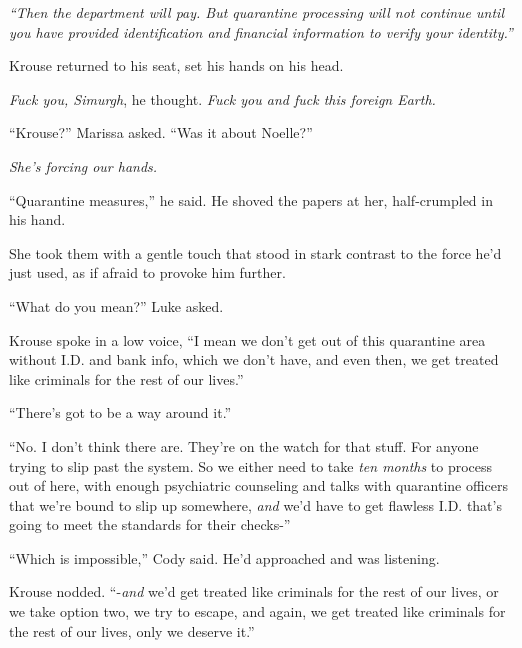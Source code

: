 \emph{``Then the department will pay.  But quarantine processing will not continue until you have provided identification and financial information to verify your identity.''}



Krouse returned to his seat, set his hands on his head.



\emph{Fuck you, Simurgh}, he thought.  \emph{Fuck you and fuck this foreign Earth.}



``Krouse?''  Marissa asked.  ``Was it about Noelle?''



\emph{She's forcing our hands.}



``Quarantine measures,'' he said.  He shoved the papers at her, half-crumpled in his hand.



She took them with a gentle touch that stood in stark contrast to the force he'd just used, as if afraid to provoke him further.



``What do you mean?'' Luke asked.



Krouse spoke in a low voice, ``I mean we don't get out of this quarantine area without I.D. and bank info, which we don't have, and even then, we get treated like criminals for the rest of our lives.''



``There's got to be a way around it.''



``No.  I don't think there are.  They're on the watch for that stuff.  For anyone trying to slip past the system.  So we either need to take \emph{ten months} to process out of here, with enough psychiatric counseling and talks with quarantine officers that we're bound to slip up somewhere, \emph{and} we'd have to get flawless I.D. that's going to meet the standards for their checks-''



``Which is impossible,'' Cody said.  He'd approached and was listening.



Krouse nodded.  ``-\emph{and} we'd get treated like criminals for the rest of our lives, or we take option two, we try to escape, and again, we get treated like criminals for the rest of our lives, only we deserve it.''



